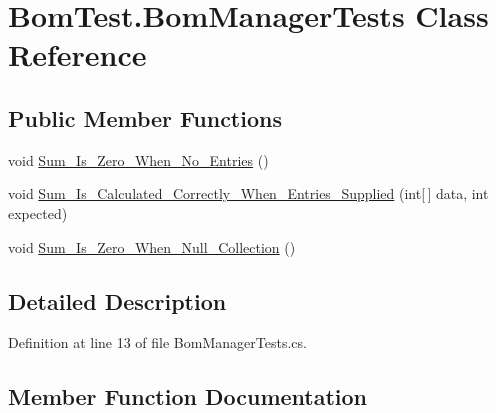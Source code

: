 \hypertarget{class_bom_test_1_1_bom_manager_tests}{}\section{Bom\+Test.\+Bom\+Manager\+Tests Class Reference}
\label{class_bom_test_1_1_bom_manager_tests}
\subsection*{Public Member Functions}
\begin{DoxyCompactItemize}
\item 
void \mbox{\hyperlink{class_bom_test_1_1_bom_manager_tests_a3ccc7263a8e8f40d49e2d23c084d7b18}{Sum\+\_\+\+Is\+\_\+\+Zero\+\_\+\+When\+\_\+\+No\+\_\+\+Entries}} ()
\item 
void \mbox{\hyperlink{class_bom_test_1_1_bom_manager_tests_aff82aa5344cd370d227317bbecbb4846}{Sum\+\_\+\+Is\+\_\+\+Calculated\+\_\+\+Correctly\+\_\+\+When\+\_\+\+Entries\+\_\+\+Supplied}} (int\mbox{[}$\,$\mbox{]} data, int expected)
\item 
void \mbox{\hyperlink{class_bom_test_1_1_bom_manager_tests_a15f99229c5e904f90e0cf1dead175869}{Sum\+\_\+\+Is\+\_\+\+Zero\+\_\+\+When\+\_\+\+Null\+\_\+\+Collection}} ()
\end{DoxyCompactItemize}


\subsection{Detailed Description}


Definition at line 13 of file Bom\+Manager\+Tests.\+cs.



\subsection{Member Function Documentation}
\mbox{\label{class_bom_test_1_1_bom_manager_tests_aff82aa5344cd370d227317bbecbb4846}} 
